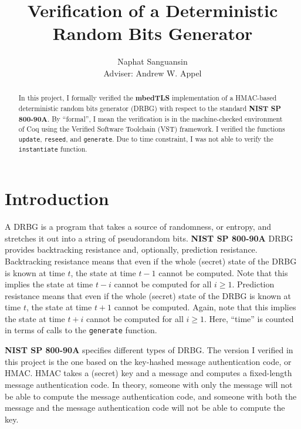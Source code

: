 \documentclass[pageno]{jpaper}
\newcommand{\stdtitle}[1]{\textbf{#1}}
\begin{document}
\title{
Verification of a Deterministic Random Bits Generator
}

\author{Naphat Sanguansin\\Adviser: Andrew W. Appel}

\date{}
\maketitle

\thispagestyle{empty}
\doublespacing
\begin{abstract}
In this project, I formally verified the \stdtitle{mbedTLS} implementation of a HMAC-based deterministic random bits generator (DRBG) with respect to the standard \stdtitle{NIST SP 800-90A}. By “formal”, I mean the verification is in the machine-checked environment of Coq using the Verified Software Toolchain (VST) framework. I verified the functions \lstinline{update}, \lstinline{reseed}, and \lstinline{generate}. Due to time constraint, I was not able to verify the \lstinline{instantiate} function.
\end{abstract}

\section{Introduction}
A DRBG is a program that takes a source of randomness, or entropy, and stretches it out into a string of pseudorandom bits. \stdtitle{NIST SP 800-90A} \cite{nist} DRBG provides backtracking resistance and, optionally, prediction resistance. Backtracking resistance means that even if the whole (secret) state of the DRBG is known at time $t$, the state at time $t - 1$ cannot be computed. Note that this implies the state at time $t - i$ cannot be computed for all $i \geq 1$. Prediction resistance means that even if the whole (secret) state of the DRBG is known at time $t$, the state at time $t + 1$ cannot be computed. Again, note that this implies the state at time $t + i$ cannot be computed for all $i \geq 1$. Here, “time” is counted in terms of calls to the \lstinline{generate} function.

\stdtitle{NIST SP 800-90A} specifies different types of DRBG. The version I verified in this project is the one based on the key-hashed message authentication code, or HMAC. HMAC takes a (secret) key and a message and computes a fixed-length message authentication code. In theory, someone with only the message will not be able to compute the message authentication code, and someone with both the message and the message authentication code will not be able to compute the key.
\end{document}
